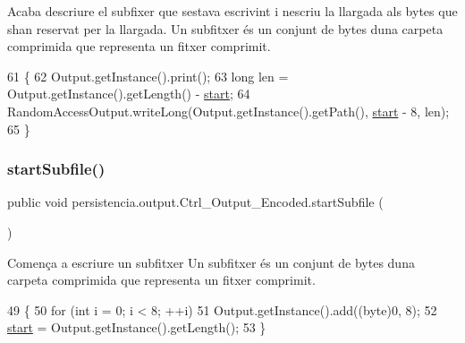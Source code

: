 Acaba d\textquotesingle{}escriure el subfixer que s\textquotesingle{}estava escrivint i n\textquotesingle{}escriu la llargada als bytes que s\textquotesingle{}han reservat per la llargada. Un subfitxer és un conjunt de bytes d\textquotesingle{}una carpeta comprimida que representa un fitxer comprimit. 


\begin{DoxyCode}
61                              \{
62         Output.getInstance().print();
63         \textcolor{keywordtype}{long} len = Output.getInstance().getLength() - \hyperlink{classpersistencia_1_1output_1_1Ctrl__Output__Encoded_a297adbe95417ad0a03883da607ec6dfe}{start};
64         RandomAccessOutput.writeLong(Output.getInstance().getPath(), \hyperlink{classpersistencia_1_1output_1_1Ctrl__Output__Encoded_a297adbe95417ad0a03883da607ec6dfe}{start} - 8, len);
65     \}
\end{DoxyCode}
\mbox{\label{classpersistencia_1_1output_1_1Ctrl__Output__Encoded_a2cabdf68c3f3a5731933f78609d9c302}} 
\subsubsection{\texorpdfstring{start\+Subfile()}{startSubfile()}}
{\footnotesize\ttfamily public void persistencia.\+output.\+Ctrl\+\_\+\+Output\+\_\+\+Encoded.\+start\+Subfile (\begin{DoxyParamCaption}{ }\end{DoxyParamCaption})\hspace{0.3cm}{\ttfamily [inline]}}



Comença a escriure un subfitxer Un subfitxer és un conjunt de bytes d\textquotesingle{}una carpeta comprimida que representa un fitxer comprimit. 


\begin{DoxyCode}
49                                \{
50         \textcolor{keywordflow}{for} (\textcolor{keywordtype}{int} i = 0; i < 8; ++i)
51             Output.getInstance().add((byte)0, 8);
52         \hyperlink{classpersistencia_1_1output_1_1Ctrl__Output__Encoded_a297adbe95417ad0a03883da607ec6dfe}{start} = Output.getInstance().getLength();
53     \}
\end{DoxyCode}


